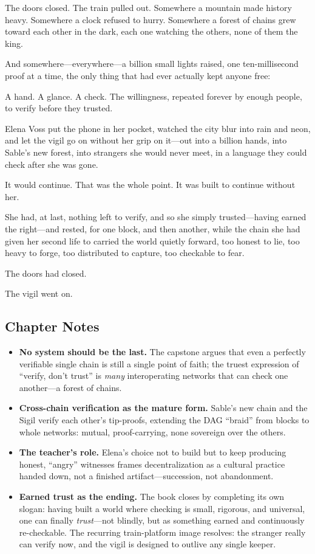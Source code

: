 The doors closed. The train pulled out. Somewhere a mountain made history heavy.
Somewhere a clock refused to hurry. Somewhere a forest of chains grew toward each
other in the dark, each one watching the others, none of them the king.

And somewhere---everywhere---a billion small lights raised, one ten-millisecond proof
at a time, the only thing that had ever actually kept anyone free:

A hand. A glance. A check. The willingness, repeated forever by enough people, to
verify before they trusted.

Elena Voss put the phone in her pocket, watched the city blur into rain and neon, and
let the vigil go on without her grip on it---out into a billion hands, into Sable's new
forest, into strangers she would never meet, in a language they could check after she
was gone.

It would continue. That was the whole point. It was built to continue without her.

She had, at last, nothing left to verify, and so she simply trusted---having earned
the right---and rested, for one block, and then another, while the chain she had given
her second life to carried the world quietly forward, too honest to lie, too heavy to
forge, too distributed to capture, too checkable to fear.

The doors had closed.

The vigil went on.

\hypertarget{chapter-26-notes}{%
\subsection{Chapter Notes}\label{chapter-26-notes}}

\begin{itemize}
\tightlist
\item
  \textbf{No system should be the last.} The capstone argues that even a perfectly
  verifiable single chain is still a single point of faith; the truest expression of
  ``verify, don't trust'' is \emph{many} interoperating networks that can check one
  another---a forest of chains.
\item
  \textbf{Cross-chain verification as the mature form.} Sable's new chain and the
  Sigil verify each other's tip-proofs, extending the DAG ``braid'' from blocks to
  whole networks: mutual, proof-carrying, none sovereign over the others.
\item
  \textbf{The teacher's role.} Elena's choice not to build but to keep producing
  honest, ``angry'' witnesses frames decentralization as a cultural practice handed
  down, not a finished artifact---succession, not abandonment.
\item
  \textbf{Earned trust as the ending.} The book closes by completing its own
  slogan: having built a world where checking is small, rigorous, and universal,
  one can finally \emph{trust}---not blindly, but as something earned and
  continuously re-checkable. The recurring train-platform image resolves: the
  stranger really can verify now, and the vigil is designed to outlive any single
  keeper.
\end{itemize}

